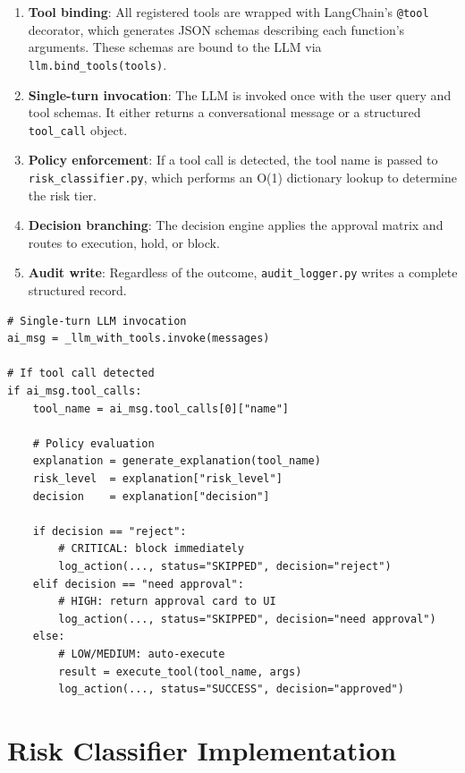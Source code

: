 \begin{enumerate}[leftmargin=1.5em]
  \item \textbf{Tool binding}: All registered tools are wrapped with LangChain's \texttt{@tool} decorator, which generates JSON schemas describing each function's arguments. These schemas are bound to the LLM via \texttt{llm.bind\_tools(tools)}.
  \item \textbf{Single-turn invocation}: The LLM is invoked once with the user query and tool schemas. It either returns a conversational message or a structured \texttt{tool\_call} object.
  \item \textbf{Policy enforcement}: If a tool call is detected, the tool name is passed to \texttt{risk\_classifier.py}, which performs an O(1) dictionary lookup to determine the risk tier.
  \item \textbf{Decision branching}: The decision engine applies the approval matrix and routes to execution, hold, or block.
  \item \textbf{Audit write}: Regardless of the outcome, \texttt{audit\_logger.py} writes a complete structured record.
\end{enumerate}

\begin{lstlisting}[caption={Core dispatch logic in agent/controller.py}, label={lst:dispatch}]
# Single-turn LLM invocation
ai_msg = _llm_with_tools.invoke(messages)

# If tool call detected
if ai_msg.tool_calls:
    tool_name = ai_msg.tool_calls[0]["name"]
    
    # Policy evaluation
    explanation = generate_explanation(tool_name)
    risk_level  = explanation["risk_level"]
    decision    = explanation["decision"]
    
    if decision == "reject":
        # CRITICAL: block immediately
        log_action(..., status="SKIPPED", decision="reject")
    elif decision == "need approval":
        # HIGH: return approval card to UI
        log_action(..., status="SKIPPED", decision="need approval")
    else:
        # LOW/MEDIUM: auto-execute
        result = execute_tool(tool_name, args)
        log_action(..., status="SUCCESS", decision="approved")
\end{lstlisting}

\section{Risk Classifier Implementation}

